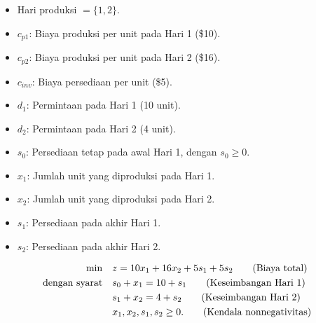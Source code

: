 \begin{solution}
\begin{itemize}
    \item Hari produksi $ = \{1, 2\}$.
\end{itemize}
\begin{itemize}
    \item $c_{p1}$: Biaya produksi per unit pada Hari 1 (\$10).
    \item $c_{p2}$: Biaya produksi per unit pada Hari 2 (\$16).
    \item $c_{inv}$: Biaya persediaan per unit (\$5).
    \item $d_1$: Permintaan pada Hari 1 (10 unit).
    \item $d_2$: Permintaan pada Hari 2 (4 unit).
    \item $s_0$: Persediaan tetap pada awal Hari 1, dengan $s_0 \geq 0$.
\end{itemize}

\begin{itemize}
    \item $x_1$: Jumlah unit yang diproduksi pada Hari 1.
    \item $x_2$: Jumlah unit yang diproduksi pada Hari 2.
    \item $s_1$: Persediaan pada akhir Hari 1.
    \item $s_2$: Persediaan pada akhir Hari 2.
\end{itemize}

\begin{align*}
\min \quad & z = 10x_1 + 16x_2 + 5s_1 + 5s_2   \tag{Biaya total} \\
\mbox{dengan syarat}\quad        & s_0 + x_1 = 10 + s_1   \tag{Keseimbangan Hari 1} \\
& s_1 + x_2 = 4 + s_2   \tag{Keseimbangan Hari 2} \\
& x_1, x_2, s_1, s_2 \geq 0.   \tag{Kendala nonnegativitas}
\end{align*}

\end{solution}

